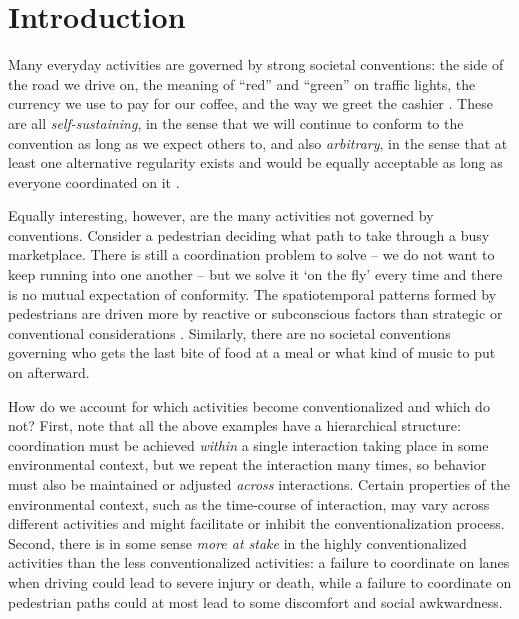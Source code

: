\documentclass[10pt,letterpaper]{article}
\begin{document}
\linenumbers

\section*{Introduction}
Many everyday activities are governed by strong societal conventions: the side of the road we drive on, the meaning of ``red'' and ``green'' on traffic lights, the currency we use to pay for our coffee, and the way we greet the cashier \cite{ClarkWilkesGibbs86_ReferringCollaborative, GarrodAnderson87_SayingWhatYouMean, CaldwellSmith12_Conventions, CentolaBaronchelli15_ConventionEmergence}. These are all \emph{self-sustaining}, in the sense that we will continue to conform to the convention as long as we expect others to, and also \emph{arbitrary}, in the sense that at least one alternative regularity exists and would be equally acceptable as long as everyone coordinated on it \cite{Lewis69_Convention}.%

Equally interesting, however, are the many activities not governed by conventions. Consider a pedestrian deciding what path to take through a busy marketplace. There is still a coordination problem to solve -- we do not want to keep running into one another -- but we solve it `on the fly' every time and there is no mutual expectation of conformity. The spatiotemporal patterns formed by pedestrians are driven more by reactive or subconscious factors than strategic or conventional considerations \cite{HelbingBuznaWerner05_PedestrianCrowdDynamics}. Similarly, there are no societal conventions governing who gets the last bite of food at a meal or what kind of music to put on afterward. 

How do we account for which activities become conventionalized and which do not? First, note that all the above examples have a hierarchical structure: coordination must be achieved \emph{within} a single interaction taking place in some environmental context, but we repeat the interaction many times, so behavior must also be maintained or adjusted \emph{across} interactions. Certain properties of the environmental context, such as the time-course of interaction, may vary across different activities and might facilitate or inhibit the conventionalization process. Second, there is in some sense \emph{more at stake} in the highly conventionalized activities than the less conventionalized activities: a failure to coordinate on lanes when driving could lead to severe injury or death, while a failure to coordinate on pedestrian paths could at most lead to some discomfort and social awkwardness.
\end{document}
